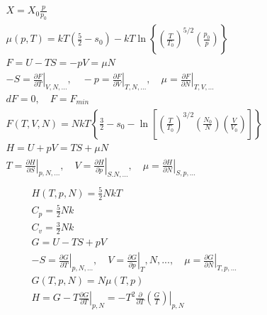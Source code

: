 \documentclass[10pt]{article}
\newcommand{\pder}[2]{\frac{\partial #1}{\partial #2}}
\newcommand{\lrp}[1]{\left( #1 \right)}
\newcommand{\lrb}[1]{\left[ #1 \right]}
\newcommand{\lrc}[1]{\left\{ #1 \right\}}
\newcommand{\evalb}[1]{\left. #1 \right|}
\begin{document}
\begin{multicols}{2}
\begin{align*}
		& X = X_0 \frac{p}{p_0}		\tag*{Henry-Dalton law, concentration of a gas in a solution (GNS pg. 78)} \\
		& \mu (p,T) = kT \lrp{\frac{5}{2} - s_0} - kT \ln \lrc{\lrp{\frac{T}{T_0}}^{5/2} \lrp{\frac{p_0}{p}}}	\tag*{Chem. pot. of ideal gas (GNS 4.14)} \\
		& F = U - TS = -pV = \mu N	\tag*{Free energy [Helmholtz potential] (GNS 4.36)} \\
		& -S = \evalb{\pder{F}{T}}_{V,N,...}, \quad -p = \evalb{\pder{F}{V}}_{T,N,...}, \quad \mu = \evalb{\pder{F}{N}}_{T,V,...}	\tag*{State quanties from free energy (GNS 4.39)} \\
		& dF = 0, \quad F=F_{min}	\tag*{Property of irreversible processes (GNS 4.50)} \\
		& F(T,V,N) = NkT \lrc{\frac{3}{2} - s_0 - \ln \lrb{ \lrp{\frac{T}{T_0}}^{3/2} \lrp{\frac{N_0}{N}} \lrp{\frac{V}{V_0}} }} \tag*{$F$ of ideal gas (GNS 4.53)} \\
		& H = U + pV = TS + \mu N	\tag*{Definition of enthalpy (GNS 4.59)} \\
		& T =  \evalb{\pder{H}{S}}_{p,N,...}, \quad V = \evalb{\pder{H}{p}}_{S.N,...}, \quad \mu = \evalb{\pder{H}{N}}_{S,p,...}	\tag*{State quantities from enthalpy (GNS 4.61)} \\	
	\end{align*} \linebreak
	\setlength{\abovedisplayskip}{-25pt}
	\setlength{\belowdisplayskip}{-10pt}
	\setlength{\abovedisplayshortskip}{0pt}
	\setlength{\belowdisplayshortskip}{0pt}
	\begin{align*} 
		& H(T,p,N) = \frac{5}{2} NkT	\tag*{Enthalpy of an ideal gas (GNS 4.78)} \\
		& C_p = \frac{5}{2}Nk	\tag*{Specific heat, constant pressure, of an ideal gas (GNS 4.79)} \\
		& C_v = \frac{3}{2}Nk	\tag*{Specific heat, constant volume, of an ideal gas (GNS 4.80)} \\
		& G = U - TS + pV	\tag*{Free enthalpy [Gibbs' potential] (GNS 4.81)} \\
		& -S = \evalb{\pder{G}{T}}_{p,N,...}, \quad V = \evalb{\pder{G}{p}}_T,N,..., \quad \mu = \evalb{\pder{G}{N}}_{T,p,...}	\tag*{State quantities from Gibbs' potential (GNS 4.83)} \\
		& G(T,p,N) = N \mu(T,p)	\tag*{Free enthalpy of the ideal gas (GNS Ex. 4.10)} \\
		& H = G- T \evalb{\pder{G}{T}}_{p,N} = -T^2 \pder{}{T} \evalb{\lrp{\frac{G}{T}}}_{p,N}	\tag*{Gibbs-Helmholtz equation (GNS 4.94)} \\

\end{align*}
\end{multicols}
\end{document}
